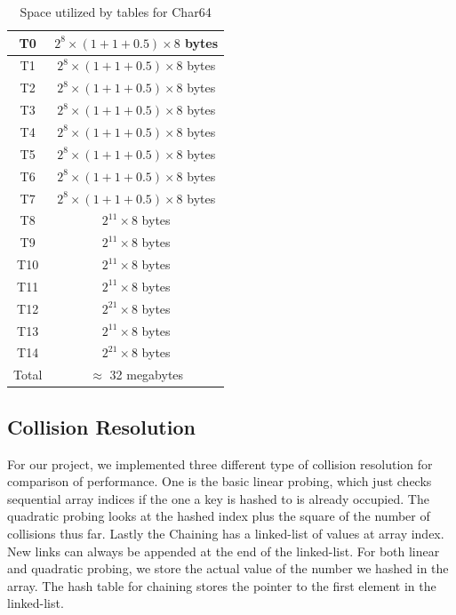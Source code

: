 \documentclass[11pt]{article}
\begin{document}
\begin{table}
\centering 
\begin{tabular}{|c|c|}
  \hline
T0 & $2^{8}\times(1+1+0.5) \times8$ bytes\\  \hline
T1 & $2^{8}\times(1+1+0.5) \times8$ bytes\\ \hline
T2 & $2^{8}\times (1+1+0.5) \times8$ bytes\\  \hline
T3 & $2^{8}\times (1+1+0.5) \times8$ bytes\\ \hline
T4 & $2^{8}\times(1+1+0.5) \times8$ bytes\\  \hline
T5 & $2^{8}\times(1+1+0.5) \times8$ bytes\\ \hline
T6 & $2^{8}\times (1+1+0.5) \times8$ bytes\\  \hline
T7 & $2^{8}\times (1+1+0.5) \times8$ bytes\\ \hline
T8 & $2^{11}\times8$ bytes\\  \hline
T9 & $2^{11}\times8$ bytes\\ \hline
T10 & $2^{11}\times8$ bytes\\  \hline
T11 & $2^{11}\times8$ bytes\\ \hline
T12 & $2^{21}\times8$ bytes\\  \hline
T13 & $2^{11}\times8$ bytes\\ \hline
T14 & $2^{21}\times8$ bytes\\
  \hline \hline
  Total & $\approx$ 32 megabytes \\
  \hline
\end{tabular}
\caption{Space utilized by tables for Char64}
\label{tab:char64mem}
\end{table}

\subsection{Collision Resolution}
For our project, we implemented three different type of collision resolution
for comparison of performance. One is the basic linear probing, which 
just checks sequential array indices if the one a key is hashed to is already occupied.
The quadratic probing looks at the hashed index plus the square of 
the number of collisions thus far. Lastly the Chaining has a linked-list of values at array
index. New links can always be appended at the end of the linked-list.
For both linear and quadratic probing, we store the actual value of the number we
hashed in the array. The hash table for chaining stores the pointer to the first element
in the linked-list.
\end{document}
